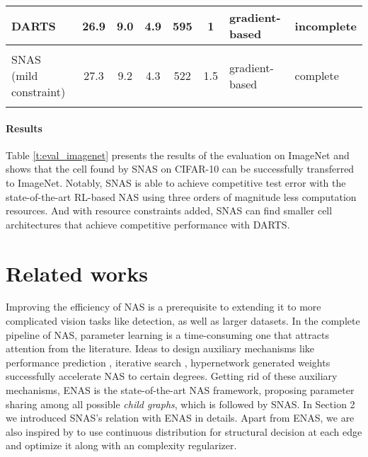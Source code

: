 \documentclass{article} \usepackage{iclr2019_conference,times}
\newcommand{\zh}{\color{black}}
\begin{document}
\begin{table}[t]
\begin{center}
{\begin{tabular}{lcccccll}
DARTS \citep{liu2018darts}   &26.9 &9.0  &4.9  &595   &1  &gradient-based  &incomplete
\vspace{0.1cm}
\\ \hline \vspace{-0.2cm}\\
SNAS (mild constraint)   &27.3  &9.2  &4.3     &522     &1.5  &gradient-based   &complete
\vspace{0.1cm}
\\ \hline
\vspace{-0.5cm}
\end{tabular}}
\end{center}
\end{table}

\paragraph{Results}

Table \ref{t:eval_imagenet} presents the results of the evaluation on ImageNet and shows that the cell found by SNAS on CIFAR-10 can be successfully transferred to ImageNet. Notably, SNAS is able to achieve competitive test error with the state-of-the-art RL-based NAS using three orders of magnitude less computation resources. And with resource constraints added, SNAS can find smaller cell architectures that achieve competitive performance with DARTS.

\section{Related works}
Improving the efficiency of NAS is a prerequisite to {\zh extending} it to more complicated vision tasks like detection, as well as larger datasets. In the complete pipeline of NAS, parameter learning is a time-consuming one that attracts attention from the literature. Ideas to design auxiliary mechanisms like performance prediction \citep{baker2017accelerating, deng2017peephole}, iterative search \citep{liu2017progressive}, hypernetwork generated weights \citep{brock2017smash} successfully accelerate NAS to certain degrees. Getting rid of these auxiliary mechanism{\zh s}, ENAS \citep{pham2018efficient} is the state-of-the-art NAS framework, proposing parameter sharing among all possible \textit{child graphs}, which is followed by SNAS. In Section 2 we introduced SNAS's relation with ENAS in details. Apart {\zh from} ENAS, we are also inspired by \citet{louizos2017learning} to use continuous distribution for structural decision at each edge and optimize it along with an  complexity regularizer.
\end{document}
